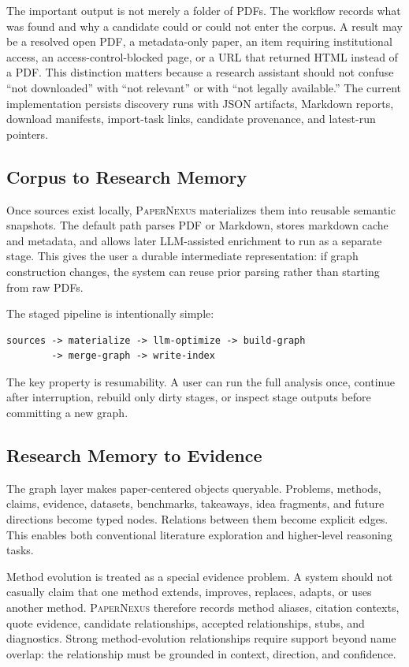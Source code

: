\documentclass[11pt]{article}
\newcommand{\papernexus}{\textsc{PaperNexus}}
\begin{document}
The important output is not merely a folder of PDFs. The workflow records what was found and why a candidate could or could not enter the corpus. A result may be a resolved open PDF, a metadata-only paper, an item requiring institutional access, an access-control-blocked page, or a URL that returned HTML instead of a PDF. This distinction matters because a research assistant should not confuse ``not downloaded'' with ``not relevant'' or with ``not legally available.'' The current implementation persists discovery runs with JSON artifacts, Markdown reports, download manifests, import-task links, candidate provenance, and latest-run pointers.

\subsection{Corpus to Research Memory}

Once sources exist locally, \papernexus{} materializes them into reusable semantic snapshots. The default path parses PDF or Markdown, stores markdown cache and metadata, and allows later LLM-assisted enrichment to run as a separate stage. This gives the user a durable intermediate representation: if graph construction changes, the system can reuse prior parsing rather than starting from raw PDFs.

The staged pipeline is intentionally simple:

\begin{lstlisting}[style=pncode]
sources -> materialize -> llm-optimize -> build-graph
        -> merge-graph -> write-index
\end{lstlisting}

The key property is resumability. A user can run the full analysis once, continue after interruption, rebuild only dirty stages, or inspect stage outputs before committing a new graph.

\subsection{Research Memory to Evidence}

The graph layer makes paper-centered objects queryable. Problems, methods, claims, evidence, datasets, benchmarks, takeaways, idea fragments, and future directions become typed nodes. Relations between them become explicit edges. This enables both conventional literature exploration and higher-level reasoning tasks.

Method evolution is treated as a special evidence problem. A system should not casually claim that one method extends, improves, replaces, adapts, or uses another method. \papernexus{} therefore records method aliases, citation contexts, quote evidence, candidate relationships, accepted relationships, stubs, and diagnostics. Strong method-evolution relationships require support beyond name overlap: the relationship must be grounded in context, direction, and confidence.
\end{document}
